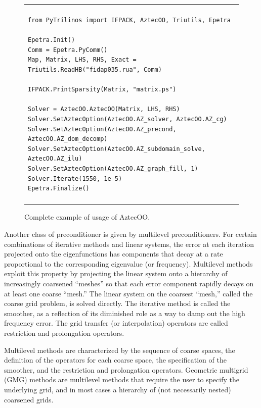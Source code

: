 \documentclass[acmtocl]{acmtrans2m}
\begin{document}
\begin{figure}
  \begin{center}
    \begin{tabular}{| p{12cm} |}
      \hline
      \\
      \footnotesize
      \begin{minipage}{11.5cm}
\begin{verbatim}
from PyTrilinos import IFPACK, AztecOO, Triutils, Epetra

Epetra.Init()
Comm = Epetra.PyComm()
Map, Matrix, LHS, RHS, Exact = Triutils.ReadHB("fidap035.rua", Comm)

IFPACK.PrintSparsity(Matrix, "matrix.ps")

Solver = AztecOO.AztecOO(Matrix, LHS, RHS)
Solver.SetAztecOption(AztecOO.AZ_solver, AztecOO.AZ_cg)
Solver.SetAztecOption(AztecOO.AZ_precond, AztecOO.AZ_dom_decomp)
Solver.SetAztecOption(AztecOO.AZ_subdomain_solve, AztecOO.AZ_ilu)
Solver.SetAztecOption(AztecOO.AZ_graph_fill, 1)
Solver.Iterate(1550, 1e-5)
Epetra.Finalize()
\end{verbatim}
      \end{minipage}
      \\
      \\
      \hline
    \end{tabular}
    \caption{Complete example of usage of AztecOO.}
    \label{fig:aztecoo}
  \end{center}
\end{figure}

\medskip

Another class of preconditioner is given by multilevel
preconditioners.  For certain combinations of iterative methods and
linear systems, the error at each iteration projected onto the
eigenfunctions has components that decay at a rate proportional to the
corresponding eigenvalue (or frequency).  Multilevel methods exploit
this property \cite{Briggs} by projecting the linear system onto a
hierarchy of increasingly coarsened ``meshes'' so that each error
component rapidly decays on at least one coarse ``mesh.''  The linear
system on the coarsest ``mesh,'' called the coarse grid problem, is
solved directly.  The iterative method is called the smoother, as a
reflection of its diminished role as a way to damp out the high
frequency error.  The grid transfer (or interpolation) operators are
called restriction and prolongation operators.

Multilevel methods are characterized by the sequence of coarse spaces,
the definition of the operators for each coarse space, the
specification of the smoother, and the restriction and prolongation
operators.  Geometric multigrid (GMG) methods are multilevel methods
that require the user to specify the underlying grid, and in most
cases a hierarchy of (not necessarily nested) coarsened grids.
\end{document}

